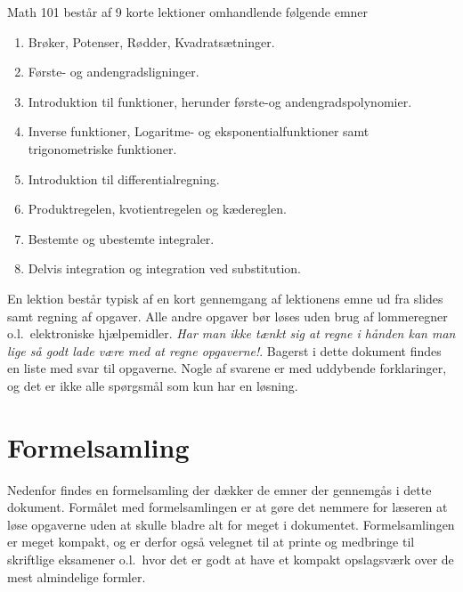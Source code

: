 Math 101 består af 9 korte lektioner omhandlende følgende emner 
\begin{enumerate}
    \item Brøker, Potenser, Rødder, Kvadratsætninger.
    \item Første- og andengradsligninger.
    \item Introduktion til funktioner, herunder første-og andengradspolynomier.
    \item Inverse funktioner, Logaritme- og eksponentialfunktioner samt trigonometriske funktioner.
    \item Introduktion til differentialregning.
    \item Produktregelen, kvotientregelen og kædereglen.
    \item Bestemte og ubestemte integraler.
    \item Delvis integration og integration ved substitution.
\end{enumerate}
En lektion består typisk af en kort gennemgang af lektionens emne ud fra slides samt regning af opgaver. Alle andre opgaver bør løses uden brug af lommeregner o.l.\ elektroniske hjælpemidler. \emph{Har man ikke tænkt sig at regne i hånden kan man lige så godt lade være med at regne opgaverne!}. Bagerst i dette dokument findes en liste med svar til opgaverne. Nogle af svarene er med uddybende forklaringer, og det er ikke alle spørgsmål som kun har en løsning.


\pagestyle{fancy}
\chapter{Formelsamling}
Nedenfor findes en formelsamling der dækker de emner der gennemgås i dette dokument. Formålet med formelsamlingen er at gøre det nemmere for læseren at løse opgaverne uden at skulle bladre alt for meget i dokumentet. Formelsamlingen er meget kompakt, og er derfor også velegnet til at printe og medbringe til skriftlige eksamener o.l.\ hvor det er godt at have et kompakt opslagsværk over de mest almindelige formler.
{ 
    \fontsize{8pt}{0.5pt}\selectfont
    \setlength{\abovedisplayskip}{1pt}
    \setlength{\belowdisplayskip}{1pt}
    \pagestyle{empty}
    \setlength{\parindent}{0pt}
    \small
    \begin{multicols*}{3}
        
        
        
        
        
        \phantom{asdfjæasdjfæsalkdjfælsadjfælksadjfælksadjfælkadsjfælksadjfælsakdjfælsakdjfælsakdjfælksadjfælakdsjfældsakjfæl}
        \vfill
    \end{multicols*}
    }
\restoregeometry
{}
